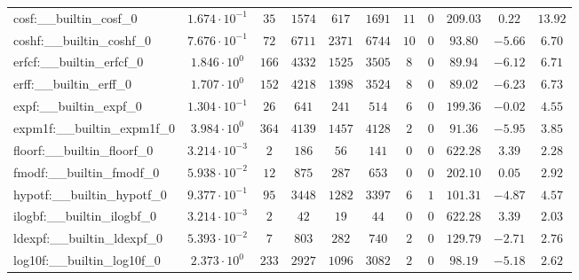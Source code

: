 \begin{tabular}{|l|c|c|c|c|c|c|c|c|c|c|}
cosf:\_\_builtin\_cosf\_0                 & $ 1.674 \cdot 10^{-1} $ & $ 35     $ & $ 1574   $ & $ 617   $ & $ 1691   $ & $ 11  $ & $ 0 $ & $ 209.03      $ & $ 0.22    $ & $ 13.92   $ \\
coshf:\_\_builtin\_coshf\_0               & $ 7.676 \cdot 10^{-1} $ & $ 72     $ & $ 6711   $ & $ 2371  $ & $ 6744   $ & $ 10  $ & $ 0 $ & $ 93.80       $ & $ -5.66   $ & $ 6.70    $ \\
erfcf:\_\_builtin\_erfcf\_0               & $ 1.846 \cdot 10^{0}  $ & $ 166    $ & $ 4332   $ & $ 1525  $ & $ 3505   $ & $ 8   $ & $ 0 $ & $ 89.94       $ & $ -6.12   $ & $ 6.71    $ \\
erff:\_\_builtin\_erff\_0                 & $ 1.707 \cdot 10^{0}  $ & $ 152    $ & $ 4218   $ & $ 1398  $ & $ 3524   $ & $ 8   $ & $ 0 $ & $ 89.02       $ & $ -6.23   $ & $ 6.73    $ \\
expf:\_\_builtin\_expf\_0                 & $ 1.304 \cdot 10^{-1} $ & $ 26     $ & $ 641    $ & $ 241   $ & $ 514    $ & $ 6   $ & $ 0 $ & $ 199.36      $ & $ -0.02   $ & $ 4.55    $ \\
expm1f:\_\_builtin\_expm1f\_0             & $ 3.984 \cdot 10^{0}  $ & $ 364    $ & $ 4139   $ & $ 1457  $ & $ 4128   $ & $ 2   $ & $ 0 $ & $ 91.36       $ & $ -5.95   $ & $ 3.85    $ \\
floorf:\_\_builtin\_floorf\_0             & $ 3.214 \cdot 10^{-3} $ & $ 2      $ & $ 186    $ & $ 56    $ & $ 141    $ & $ 0   $ & $ 0 $ & $ 622.28      $ & $ 3.39    $ & $ 2.28    $ \\
fmodf:\_\_builtin\_fmodf\_0               & $ 5.938 \cdot 10^{-2} $ & $ 12     $ & $ 875    $ & $ 287   $ & $ 653    $ & $ 0   $ & $ 0 $ & $ 202.10      $ & $ 0.05    $ & $ 2.92    $ \\
hypotf:\_\_builtin\_hypotf\_0             & $ 9.377 \cdot 10^{-1} $ & $ 95     $ & $ 3448   $ & $ 1282  $ & $ 3397   $ & $ 6   $ & $ 1 $ & $ 101.31      $ & $ -4.87   $ & $ 4.57    $ \\
ilogbf:\_\_builtin\_ilogbf\_0             & $ 3.214 \cdot 10^{-3} $ & $ 2      $ & $ 42     $ & $ 19    $ & $ 44     $ & $ 0   $ & $ 0 $ & $ 622.28      $ & $ 3.39    $ & $ 2.03    $ \\
ldexpf:\_\_builtin\_ldexpf\_0             & $ 5.393 \cdot 10^{-2} $ & $ 7      $ & $ 803    $ & $ 282   $ & $ 740    $ & $ 2   $ & $ 0 $ & $ 129.79      $ & $ -2.71   $ & $ 2.76    $ \\
log10f:\_\_builtin\_log10f\_0             & $ 2.373 \cdot 10^{0}  $ & $ 233    $ & $ 2927   $ & $ 1096  $ & $ 3082   $ & $ 2   $ & $ 0 $ & $ 98.19       $ & $ -5.18   $ & $ 2.62    $ \\

\end{tabular}
